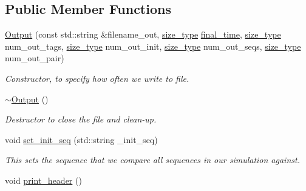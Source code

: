\subsection*{Public Member Functions}
\begin{DoxyCompactItemize}
\item 
\mbox{\hyperlink{classrcombinator_1_1Output_ac4dcc9e837413d0669f5b943f8d82dde}{Output}} (const std\+::string \&filename\+\_\+out, \mbox{\hyperlink{constants_8h_abcd18a5521fc90ff6e7b00e4fee98397}{size\+\_\+type}} \mbox{\hyperlink{classrcombinator_1_1Output_a6cb6e4bce4969d70ef39bfd35cea199e}{final\+\_\+time}}, \mbox{\hyperlink{constants_8h_abcd18a5521fc90ff6e7b00e4fee98397}{size\+\_\+type}} num\+\_\+out\+\_\+tags, \mbox{\hyperlink{constants_8h_abcd18a5521fc90ff6e7b00e4fee98397}{size\+\_\+type}} num\+\_\+out\+\_\+init, \mbox{\hyperlink{constants_8h_abcd18a5521fc90ff6e7b00e4fee98397}{size\+\_\+type}} num\+\_\+out\+\_\+seqs, \mbox{\hyperlink{constants_8h_abcd18a5521fc90ff6e7b00e4fee98397}{size\+\_\+type}} num\+\_\+out\+\_\+pair)
\begin{DoxyCompactList}\small\item\em Constructor, to specify how often we write to file. \end{DoxyCompactList}\item 
\mbox{\label{classrcombinator_1_1Output_a61d0840daf98bea49e4dc471f235eeab}} 
\mbox{\hyperlink{classrcombinator_1_1Output_a61d0840daf98bea49e4dc471f235eeab}{$\sim$\+Output}} ()
\begin{DoxyCompactList}\small\item\em Destructor to close the file and clean-\/up. \end{DoxyCompactList}\item 
\mbox{\label{classrcombinator_1_1Output_a5feb518230443e8259aeb3b12ecae437}} 
void \mbox{\hyperlink{classrcombinator_1_1Output_a5feb518230443e8259aeb3b12ecae437}{set\+\_\+init\+\_\+seq}} (std\+::string \+\_\+init\+\_\+seq)
\begin{DoxyCompactList}\small\item\em This sets the sequence that we compare all sequences in our simulation against. \end{DoxyCompactList}\item 
\mbox{\label{classrcombinator_1_1Output_a210fa5a86077912c8cf95d15603c1ad2}} 
void \mbox{\hyperlink{classrcombinator_1_1Output_a210fa5a86077912c8cf95d15603c1ad2}{print\+\_\+header}} ()

\end{DoxyCompactItemize}
